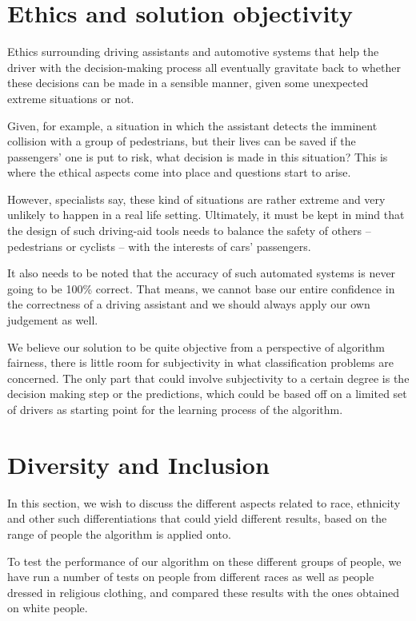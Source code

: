 \documentclass[runningheads,a4paper,11pt]{report}
\begin{document}
\section{Ethics and solution objectivity}

Ethics surrounding driving assistants and automotive systems that help the driver with the decision-making process all eventually gravitate back to whether these decisions can be made in a sensible manner, given some unexpected extreme situations or not. 

Given, for example, a situation in which the assistant detects the imminent collision with a group of pedestrians, but their lives can be saved if the passengers' one is put to risk, what decision is made in this situation? This is where the ethical aspects come into place and questions start to arise. 

However, specialists say, these kind of situations are rather extreme and very unlikely to happen in a real life setting. Ultimately, it must be kept in mind that the design of such driving-aid tools needs to balance the safety of others – pedestrians or cyclists – with the interests of cars' passengers.

It also needs to be noted that the accuracy of such automated systems is never going to be 100\% correct. That means, we cannot base our entire confidence in the correctness of a driving assistant and we should always apply our own judgement as well. 

We believe our solution to be quite objective from a perspective of algorithm fairness, there is little room for subjectivity in what classification problems are concerned. The only part that could involve subjectivity to a certain degree is the decision making step or the predictions, which could be based off on a limited set of drivers as starting point for the learning process of the algorithm.

\section{Diversity and Inclusion}

In this section, we wish to discuss the different aspects related to race, ethnicity and other such differentiations that could yield different results, based on the range of people the algorithm is applied onto.

To test the performance of our algorithm on these different groups of people, we have run a number of tests on people from different races as well as people dressed in religious clothing, and compared these results with the ones obtained on white people.
\end{document}
